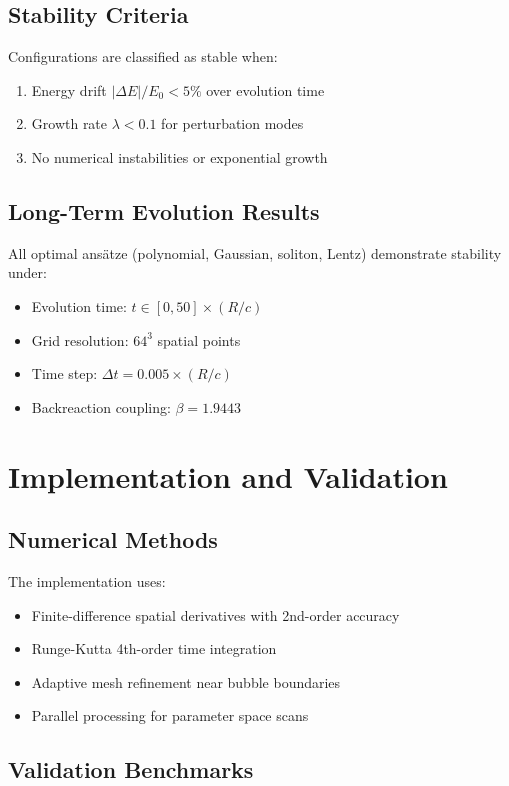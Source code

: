 \documentclass[11pt,a4paper]{article}
\begin{document}
\begin{table}[h]
\subsection{Stability Criteria}

Configurations are classified as stable when:
\begin{enumerate}
\item Energy drift $|\Delta E|/E_0 < 5\%$ over evolution time
\item Growth rate $\lambda < 0.1$ for perturbation modes  
\item No numerical instabilities or exponential growth
\end{enumerate}

\subsection{Long-Term Evolution Results}

All optimal ansätze (polynomial, Gaussian, soliton, Lentz) demonstrate stability under:
\begin{itemize}
\item Evolution time: $t \in [0, 50] \times (R/c)$
\item Grid resolution: $64^3$ spatial points
\item Time step: $\Delta t = 0.005 \times (R/c)$
\item Backreaction coupling: $\beta = 1.9443$
\end{itemize}

\section{Implementation and Validation}

\subsection{Numerical Methods}

The implementation uses:
\begin{itemize}
\item Finite-difference spatial derivatives with 2nd-order accuracy
\item Runge-Kutta 4th-order time integration
\item Adaptive mesh refinement near bubble boundaries
\item Parallel processing for parameter space scans
\end{itemize}

\subsection{Validation Benchmarks}


\end{table}
\end{document}
